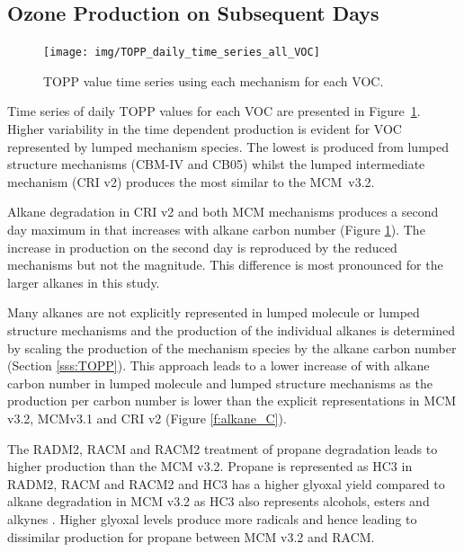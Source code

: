 \subsection{Ozone Production on Subsequent Days} \label{ss:profiles} %

\begin{figure}
    \centering
    \texttt{[image: img/TOPP\_daily\_time\_series\_all\_VOC]}
    \vspace{0mm}
    \caption{TOPP value time series using each mechanism for each VOC.}
    \vspace{-4mm}
    \label{f:TOPP_dailies}
\end{figure}

Time series of daily TOPP values for each VOC are presented in \mbox{Figure \ref{f:TOPP_dailies}}. 
Higher variability in the time dependent  production is evident for VOC represented by lumped mechanism species.
The lowest  is produced from lumped structure mechanisms (CBM-IV and CB05) whilst the lumped intermediate mechanism (CRI v2) produces the most similar  to the \mbox{MCM v3.2}.

Alkane degradation in CRI v2 and both MCM mechanisms produces a second day maximum in  that increases with alkane carbon number (Figure \ref{f:TOPP_dailies}).
The increase in  production on the second day is reproduced by the reduced mechanisms but not the magnitude.
This difference is most pronounced for the larger alkanes in this study.

Many alkanes are not explicitly represented in lumped molecule or lumped structure mechanisms and the  production of the individual alkanes is determined by scaling the  production of the mechanism species by the alkane carbon number (Section \ref{sss:TOPP}).
This approach leads to a lower increase of  with alkane carbon number in lumped molecule and lumped structure mechanisms as the  production per carbon number is lower than the explicit representations in MCM v3.2, MCMv3.1 and CRI v2 (Figure \ref{f:alkane_C}).

The RADM2, RACM and RACM2 treatment of propane degradation leads to higher  production than the MCM v3.2.
Propane is represented as HC3 in RADM2, RACM and RACM2 and HC3 has a higher glyoxal yield compared to alkane degradation in MCM v3.2 as HC3 also represents alcohols, esters and alkynes \citep{Stockwell:1990, Stockwell:1997, Goliff:2013}.
Higher glyoxal levels produce more radicals and hence  leading to dissimilar  production for propane between MCM v3.2 and RACM.

